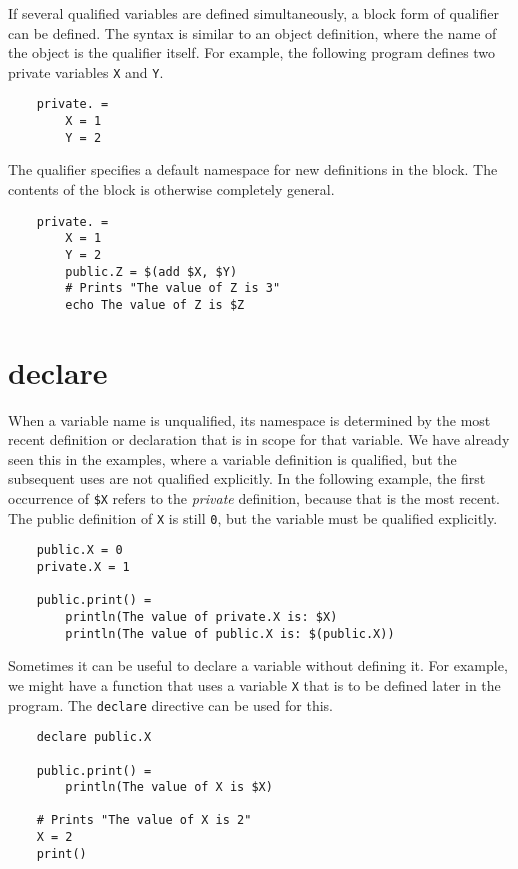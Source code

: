 If several qualified variables are defined simultaneously, a block form of qualifier can be defined.
The syntax is similar to an object definition, where the name of the object is the qualifier itself.
For example, the following program defines two private variables \verb+X+ and \verb+Y+.

\begin{verbatim}
    private. =
        X = 1
        Y = 2
\end{verbatim}
%
The qualifier specifies a default namespace for new definitions in the block.  The contents of the
block is otherwise completely general.

\begin{verbatim}
    private. =
        X = 1
        Y = 2
        public.Z = $(add $X, $Y)
        # Prints "The value of Z is 3"
        echo The value of Z is $Z
\end{verbatim}

\section{declare}
\label{section:declare}

When a variable name is unqualified, its namespace is determined by the most recent definition or
declaration that is in scope for that variable.  We have already seen this in the examples, where a
variable definition is qualified, but the subsequent uses are not qualified explicitly.  In the
following example, the first occurrence of \verb+$X+ refers to the \emph{private} definition,
because that is the most recent.  The public definition of \verb+X+ is still \verb+0+, but the
variable must be qualified explicitly.

\begin{verbatim}
    public.X = 0
    private.X = 1
    
    public.print() =
        println(The value of private.X is: $X)
        println(The value of public.X is: $(public.X))
\end{verbatim}
%
Sometimes it can be useful to declare a variable without defining it.  For example, we might have a
function that uses a variable \verb+X+ that is to be defined later in the program.  The
\verb+declare+ directive can be used for this.

\begin{verbatim}
    declare public.X

    public.print() =
        println(The value of X is $X)

    # Prints "The value of X is 2"
    X = 2
    print()
\end{verbatim}

